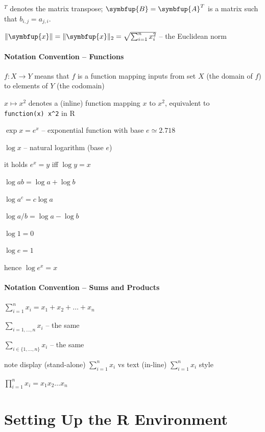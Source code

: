 \documentclass[10pt,b5paper,krantz1]{krantz}
\renewcommand{\mathbf}[1]{\symbfup{#1}}
\renewcommand{\boldsymbol}[1]{\symbfup{#1}}
\begin{document}
\({}^T\) denotes the matrix transpose;
\(\mathbf{B}=\mathbf{A}^T\) is a matrix such that \(b_{i,j}=a_{j,i}\).

\(\|\boldsymbol{x}\| = \|\boldsymbol{x}\|_2 = \sqrt{ \sum_{i=1}^n x_i^2 }\) -- the Euclidean norm

\hypertarget{notation-convention-functions}{%
\subsubsection*{Notation Convention -- Functions}\label{notation-convention-functions}}


\(f:X\to Y\) means that \(f\) is a function mapping inputs from set \(X\) (the domain of \(f\))
to elements of \(Y\) (the codomain)

\(x\mapsto x^2\) denotes a (inline) function mapping \(x\) to \(x^2\),
equivalent to \texttt{function(x)\ x\^{}2} in R

\(\exp x = e^x\) -- exponential function with base \(e\simeq 2.718\)

\(\log x\) -- natural logarithm (base \(e\))

it holds \(e^x = y\) iff \(\log y = x\)

\(\log ab = \log a + \log b\)

\(\log a^c = c\log a\)

\(\log a/b = \log a - \log b\)

\(\log 1 = 0\)

\(\log e = 1\)

hence \(\log e^x = x\)

\hypertarget{notation-convention-sums-and-products}{%
\subsubsection*{Notation Convention -- Sums and Products}\label{notation-convention-sums-and-products}}


\(\sum_{i=1}^n x_i=x_1+x_2+\dots+x_n\)

\(\sum_{i=1,\dots,n} x_i\) -- the same

\(\sum_{i\in\{1,\dots,n\}} x_i\) -- the same

note display (stand-alone) \(\displaystyle\sum_{i=1}^n x_i\) vs text (in-line) \(\textstyle\sum_{i=1}^n x_i\) style

\(\prod_{i=1}^n x_i = x_1 x_2 \dots x_n\)

\hypertarget{setting-up-the-r-environment}{%
\chapter{Setting Up the R Environment}\label{setting-up-the-r-environment}}
\end{document}

